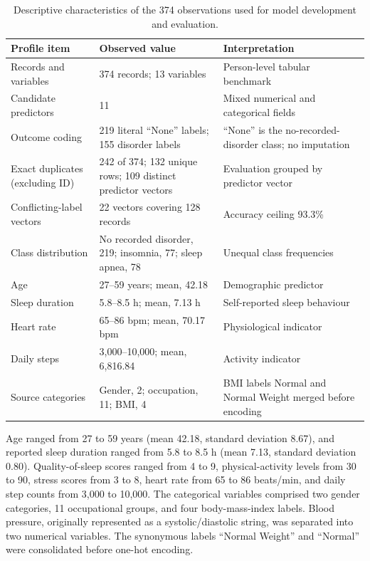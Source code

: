 \documentclass[a4paper,fleqn]{cas-dc}
\begin{document}
\begin{table}[width=\textwidth,pos=!tbp]
\centering
\caption{Descriptive characteristics of the 374 observations used for model development and evaluation.}
\label{tab:datasetprofile}
\small
\setlength{\tabcolsep}{5pt}
\renewcommand{\arraystretch}{1.05}
\begin{tabularx}{\textwidth}{@{}Q{0.25\textwidth}Q{0.27\textwidth}Y@{}}
\toprule
Profile item & Observed value & Interpretation \\
\midrule
Records and variables & 374 records; 13 variables & Person-level tabular benchmark \\
Candidate predictors & 11 & Mixed numerical and categorical fields \\
Outcome coding & 219 literal ``None'' labels; 155 disorder labels & ``None'' is the no-recorded-disorder class; no imputation \\
Exact duplicates (excluding ID) & 242 of 374; 132 unique rows; 109 distinct predictor vectors & Evaluation grouped by predictor vector \\
Conflicting-label vectors & 22 vectors covering 128 records & Accuracy ceiling 93.3\% \\
Class distribution & No recorded disorder, 219; insomnia, 77; sleep apnea, 78 & Unequal class frequencies \\
Age & 27--59 years; mean, 42.18 & Demographic predictor \\
Sleep duration & 5.8--8.5 h; mean, 7.13 h & Self-reported sleep behaviour \\
Heart rate & 65--86 bpm; mean, 70.17 bpm & Physiological indicator \\
Daily steps & 3,000--10,000; mean, 6,816.84 & Activity indicator \\
Source categories & Gender, 2; occupation, 11; BMI, 4 & BMI labels Normal and Normal Weight merged before encoding \\
\bottomrule
\end{tabularx}
\end{table}

Age ranged from 27 to 59 years (mean 42.18, standard deviation 8.67), and reported sleep duration ranged from 5.8 to 8.5 h (mean 7.13, standard deviation 0.80). Quality-of-sleep scores ranged from 4 to 9, physical-activity levels from 30 to 90, stress scores from 3 to 8, heart rate from 65 to 86 beats/min, and daily step counts from 3,000 to 10,000. The categorical variables comprised two gender categories, 11 occupational groups, and four body-mass-index labels. Blood pressure, originally represented as a systolic/diastolic string, was separated into two numerical variables. The synonymous labels ``Normal Weight'' and ``Normal'' were consolidated before one-hot encoding.
\end{document}
